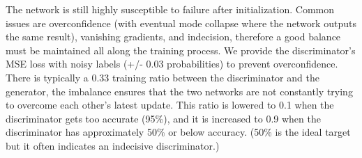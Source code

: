 The network is still highly susceptible to failure after initialization. Common issues are overconfidence (with eventual mode collapse where the network outputs the same result), vanishing gradients, and indecision, therefore a good balance must be maintained all along the training process. We provide the discriminator's \ac{MSE} loss with noisy labels (+/- 0.03 probabilities) to prevent overconfidence. There is typically a 0.33 training ratio between the discriminator and the generator, the imbalance ensures that the two networks are not constantly trying to overcome each other's latest update. This ratio is lowered to 0.1 when the discriminator gets too accurate (95\%), and it is increased to 0.9 when the discriminator has approximately 50\% or below accuracy. (50\% is the ideal target but it often indicates an indecisive discriminator.)

